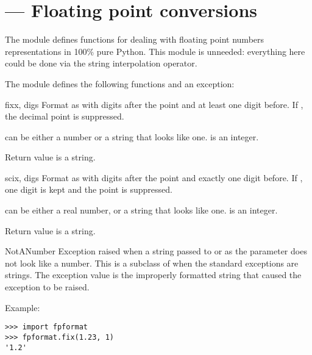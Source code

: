 \section{ ---
         Floating point conversions}



The  module defines functions for dealing with
floating point numbers representations in 100\% pure
Python.   This module is unneeded: everything here could
be done via the \code{\%} string interpolation operator.

The  module defines the following functions and an
exception:


\begin{funcdesc}{fix}{x, digs}
Format  as  with  digits after the
point and at least one digit before.
If , the decimal point is suppressed.

 can be either a number or a string that looks like
one.  is an integer.

Return value is a string.
\end{funcdesc}

\begin{funcdesc}{sci}{x, digs}
Format  as  with  digits after the 
point and exactly one digit before.
If , one digit is kept and the point is suppressed.

 can be either a real number, or a string that looks like
one.  is an integer.

Return value is a string.
\end{funcdesc}

\begin{excdesc}{NotANumber}
Exception raised when a string passed to  or
 as the  parameter does not look like a number.
This is a subclass of  when the standard
exceptions are strings.  The exception value is the improperly
formatted string that caused the exception to be raised.
\end{excdesc}

Example:

\begin{verbatim}
>>> import fpformat
>>> fpformat.fix(1.23, 1)
'1.2'
\end{verbatim}
